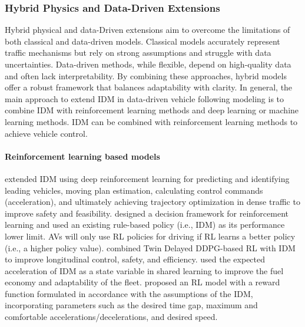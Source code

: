 \documentclass[a4paper,fleqn]{cas-sc}
\begin{document}
\subsubsection{Hybrid Physics and Data-Driven Extensions}


Hybrid physical and data-Driven extensions aim to overcome the limitations of both classical and data-driven models. Classical models accurately represent traffic mechanisms but rely on strong assumptions and struggle with data uncertainties. Data-driven methods, while flexible, depend on high-quality data and often lack interpretability. By combining these approaches, hybrid models offer a robust framework that balances adaptability with clarity. In general, the main approach to extend IDM in data-driven vehicle following modeling is to combine IDM with reinforcement learning methods and deep learning or machine learning methods. IDM can be combined with reinforcement learning methods to achieve vehicle control.

\paragraph{\textbf{Reinforcement learning based models}}
\cite{brito_learning_2022} extended IDM using deep reinforcement learning for predicting and identifying leading vehicles, moving plan estimation, calculating control commands (acceleration), and ultimately achieving trajectory optimization in dense traffic to improve safety and feasibility.\cite{caoTrustworthySafetyImprovementAutonomous2022a} designed a decision framework for reinforcement learning and used an existing rule-based policy (i.e., IDM) as its performance lower limit. AVs will only use RL policies for driving if RL learns a better policy (i.e., a higher policy value).
\cite{baiLongitudinalControlAutomatedVehicles2024a} combined Twin Delayed DDPG-based RL with IDM to improve longitudinal control, safety, and efficiency. \cite{kerbel_shared_2024} used the expected acceleration of IDM as a state variable in shared learning to improve the fuel economy and adaptability of the fleet. \cite{hartRobustCarfollowingBasedDeep2024} proposed an RL model with a reward function formulated in accordance with the assumptions of the IDM, incorporating parameters such as the desired time gap, maximum and comfortable accelerations/decelerations, and desired speed.
\end{document}
